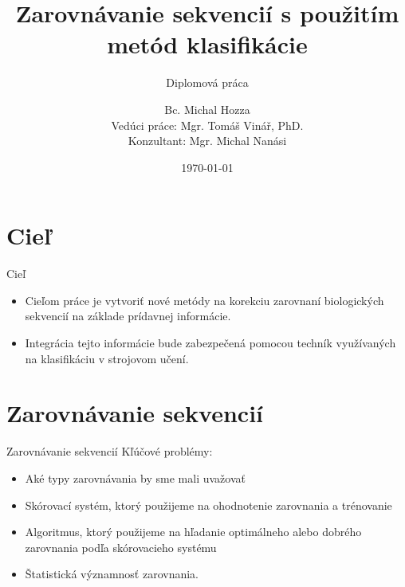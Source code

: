\documentclass[xcolor=dvipsnames, compress]{beamer}
\title{Zarovnávanie sekvencií s použitím metód klasifikácie}
\subtitle{
\vspace{0.5cm}
\small Diplomová práca
}
\author[Michal Hozza]{Bc. Michal Hozza \\ Vedúci práce: Mgr. Tomáš Vinář, PhD. \\ Konzultant: Mgr. Michal Nanási}
\institute[FMFI UK]{
  Fakulta matematiky, fyziky a informatiky,
  Univerzita Komenského, Bratislava\\
}
\date{\today}
\begin{document}
\begin{frame}[plain]
  \titlepage
\end{frame}



\section{Cieľ}
\begin{frame}{Cieľ}
  \begin{itemize}
  \item Cieľom práce je vytvoriť nové metódy na korekciu zarovnaní biologických sekvencií na základe prídavnej informácie.
  \item Integrácia tejto informácie bude zabezpečená pomocou techník využívaných na klasifikáciu v strojovom učení.
  \end{itemize} 
\end{frame}


\section{Zarovnávanie sekvencií}
\begin{frame}{Zarovnávanie sekvencií}
Kľúčové problémy:
  \begin{itemize}
    \item Aké typy zarovnávania by sme mali uvažovať
    \item Skórovací systém, ktorý použijeme na ohodnotenie zarovnania a trénovanie
    \item Algoritmus, ktorý použijeme na hľadanie optimálneho alebo dobrého zarovnania podľa skórovacieho systému
    \item Štatistická významnosť zarovnania.
  \end{itemize} 
\end{frame}
\end{document}
